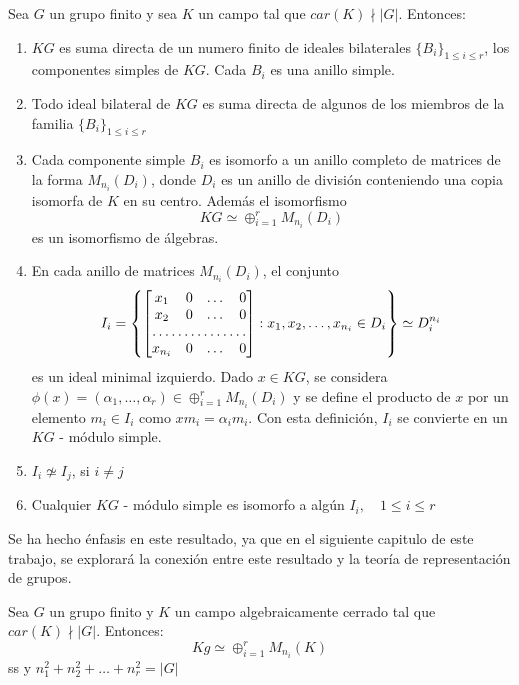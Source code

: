 \begin{teorema}\label{teo:wa}
Sea $G$ un grupo finito y sea $K$ un campo tal que $car(K) \nmid |G|$. Entonces:
\begin{enumerate}
\item $KG$ es suma directa de un numero finito de ideales bilaterales $\{B_i\}_{ 1 \leq i \leq r}$, los componentes simples de $KG$. Cada $B_i$ es una anillo simple.
\item Todo ideal bilateral de $KG$ es suma directa de algunos de los miembros de la familia $\{B_i\}_{ 1 \leq i \leq r}$
\item Cada componente simple $B_i$ es isomorfo a un anillo completo de matrices de la forma $M_{n_i}(D_i)$, donde $D_i$ es un anillo de división conteniendo una copia isomorfa de $K$ en su centro. Además el isomorfismo
\[KG \simeq \oplus_{i=1}^{r} M_{n_i}(D_i) \]
es un isomorfismo de álgebras. 
\item En cada anillo de matrices $M_{n_i}(D_i)$, el conjunto
\[ I_i =  \left\{ \begin{bmatrix}
x_1 & 0 & \dots & 0 \\
x_2 & 0 & \dots & 0 \\
\hdotsfor{4} \\
x_{n_i} & 0 & \dots & 0 \\
\end{bmatrix} : x_1, x_2, \dots, x_{n_i} \in D_i \right\} \simeq D_i^{n_i} \] 
es un ideal minimal izquierdo. 
Dado $x \in KG$, se considera $\phi (x) = (\alpha_1, \dots, \alpha_r) \in \oplus_{i=1}^r M_{n_i}(D_i)$ y se define el producto de $x$ por un elemento $m_i \in I_i$ como $xm_i = \alpha_im_i$. Con esta definición, $I_i$ se convierte en un $KG$ - módulo simple.

\item $I_i \not \simeq I_j$, si $ i \neq j$
\item Cualquier $KG$ - módulo simple es isomorfo a algún $I_i, \quad 1 \leq i \leq r$ 
\end{enumerate}
\end{teorema}

Se ha hecho énfasis en este resultado, ya que en el siguiente capitulo de este trabajo, se explorará la conexión entre este resultado y la teoría de representación de grupos. 

\begin{corolario}
Sea $G$ un grupo finito y $K$ un campo algebraicamente cerrado tal que $car(K) \nmid |G| $. Entonces:
\[Kg \simeq \oplus_{i=1}^{r} M_{n_i}(K)\]ss
y $n_1^2 + n_2^2 + \dots + n_r^2 = |G| $
\end{corolario}

